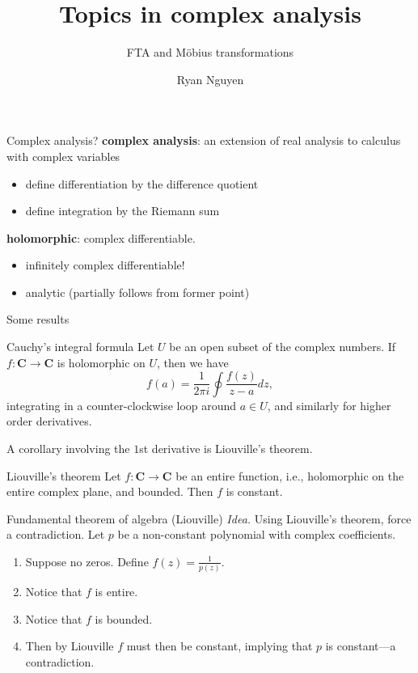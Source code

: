 \documentclass{beamer}
\title[Complex analysis]{Topics in complex analysis}
\subtitle{FTA and M\"{o}bius transformations}
\author{Ryan Nguyen}
\institute{}
\date{}
\begin{document}

\begin{frame}
\titlepage
\end{frame}

\begin{frame}[t]{Complex analysis?} \vspace{4pt}
\textbf{complex analysis}: an extension of real analysis to calculus with complex variables
\begin{itemize}
	\item define differentiation by the difference quotient
	\item define integration by the Riemann sum
\end{itemize}
\textbf{holomorphic}: complex differentiable.
\begin{itemize}
	\item infinitely complex differentiable!
	\item analytic (partially follows from former point)
\end{itemize}
\end{frame}

\begin{frame}[t]{Some results} \vspace{4pt}
\begin{block}{Cauchy's integral formula}
Let \(U\) be an open subset of the complex numbers. If \(f: \mathbf{C} \rightarrow \mathbf{C}\) is holomorphic on \(U\), then we have
\begin{equation*}
f(a) = \frac{1}{2\pi i} \oint \frac{f(z)}{z-a} dz,
\end{equation*}
integrating in a counter-clockwise loop around \(a \in U\), and similarly for higher order derivatives.
\end{block}
A corollary involving the \(1\)st derivative is Liouville's theorem.
\begin{block}{Liouville's theorem}
Let \(f: \mathbf{C} \rightarrow \mathbf{C}\) be an entire function, i.e., holomorphic on the entire complex plane, and bounded. Then \(f\) is constant.
\end{block}
\end{frame}

\begin{frame}[t]{Fundamental theorem of algebra (Liouville)} \vspace{4pt}
\textit{Idea.} Using Liouville's theorem, force a contradiction. Let \(p\) be a non-constant polynomial with complex coefficients.
\begin{enumerate}
	\item Suppose no zeros. Define \(f(z) = \frac{1}{p(z)}\).
	\item Notice that \(f\) is entire.
	\item Notice that \(f\) is bounded.
	\item Then by Liouville \(f\) must then be constant, implying that \(p\) is constant---a contradiction.
\end{enumerate}
\end{frame}
\end{document}
